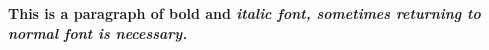 \sffamily
\textbf{This is a paragraph of bold and
\textit{italic font, sometimes returning
to \textnormal{normal font} is necessary.}}
